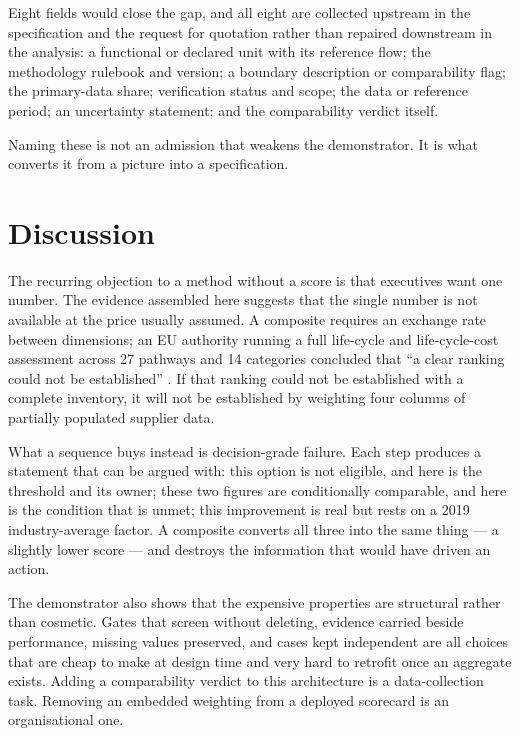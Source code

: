 \documentclass[10pt,twocolumn,a4paper]{article}
\begin{document}
Eight fields would close the gap, and all eight are collected upstream in the
specification and the request for quotation rather than repaired downstream in
the analysis: a functional or declared unit with its reference flow; the
methodology rulebook and version; a boundary description or comparability flag;
the primary-data share; verification status and scope; the data or reference
period; an uncertainty statement; and the comparability verdict itself.

Naming these is not an admission that weakens the demonstrator. It is what
converts it from a picture into a specification.

\section{Discussion}

The recurring objection to a method without a score is that executives want one
number. The evidence assembled here suggests that the single number is not
available at the price usually assumed. A composite requires an exchange rate
between dimensions; an EU authority running a full life-cycle and life-cycle-cost
assessment across 27 pathways and 14 categories concluded that ``a clear ranking
could not be established'' \cite{p2}. If that ranking could not be established
with a complete inventory, it will not be established by weighting four columns
of partially populated supplier data.

What a sequence buys instead is decision-grade failure. Each step produces a
statement that can be argued with: this option is not eligible, and here is the
threshold and its owner; these two figures are conditionally comparable, and here
is the condition that is unmet; this improvement is real but rests on a 2019
industry-average factor. A composite converts all three into the same thing --- a
slightly lower score --- and destroys the information that would have driven an
action.

The demonstrator also shows that the expensive properties are structural rather
than cosmetic. Gates that screen without deleting, evidence carried beside
performance, missing values preserved, and cases kept independent are all choices
that are cheap to make at design time and very hard to retrofit once an
aggregate exists. Adding a comparability verdict to this architecture is a
data-collection task. Removing an embedded weighting from a deployed scorecard is
an organisational one.
\end{document}
